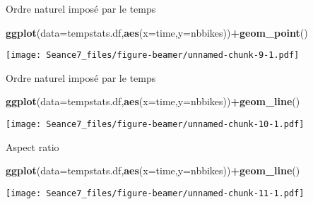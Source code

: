 \documentclass[ignorenonframetext,]{beamer}
\newenvironment{Shaded}{\begin{snugshade}}{\end{snugshade}}
\newcommand{\DataTypeTok}[1]{\textcolor[rgb]{0.13,0.29,0.53}{#1}}
\newcommand{\KeywordTok}[1]{\textcolor[rgb]{0.13,0.29,0.53}{\textbf{#1}}}
\newcommand{\NormalTok}[1]{#1}
\newcommand{\OperatorTok}[1]{\textcolor[rgb]{0.81,0.36,0.00}{\textbf{#1}}}
\begin{document}
\begin{frame}[fragile]{Ordre naturel imposé par le temps}
\protect\hypertarget{ordre-naturel-imposuxe9-par-le-temps}{}

\begin{Shaded}
\begin{Highlighting}[]
\KeywordTok{ggplot}\NormalTok{(}\DataTypeTok{data=}\NormalTok{tempstats.df,}\KeywordTok{aes}\NormalTok{(}\DataTypeTok{x=}\NormalTok{time,}\DataTypeTok{y=}\NormalTok{nbbikes))}\OperatorTok{+}\KeywordTok{geom_point}\NormalTok{()}
\end{Highlighting}
\end{Shaded}

\texttt{[image: Seance7\_files/figure-beamer/unnamed-chunk-9-1.pdf]}

\end{frame}

\begin{frame}[fragile]{Ordre naturel imposé par le temps}
\protect\hypertarget{ordre-naturel-imposuxe9-par-le-temps-1}{}

\begin{Shaded}
\begin{Highlighting}[]
\KeywordTok{ggplot}\NormalTok{(}\DataTypeTok{data=}\NormalTok{tempstats.df,}\KeywordTok{aes}\NormalTok{(}\DataTypeTok{x=}\NormalTok{time,}\DataTypeTok{y=}\NormalTok{nbbikes))}\OperatorTok{+}\KeywordTok{geom_line}\NormalTok{()}
\end{Highlighting}
\end{Shaded}

\texttt{[image: Seance7\_files/figure-beamer/unnamed-chunk-10-1.pdf]}

\end{frame}

\begin{frame}[fragile]{Aspect ratio}
\protect\hypertarget{aspect-ratio}{}

\begin{Shaded}
\begin{Highlighting}[]
\KeywordTok{ggplot}\NormalTok{(}\DataTypeTok{data=}\NormalTok{tempstats.df,}\KeywordTok{aes}\NormalTok{(}\DataTypeTok{x=}\NormalTok{time,}\DataTypeTok{y=}\NormalTok{nbbikes))}\OperatorTok{+}\KeywordTok{geom_line}\NormalTok{()}
\end{Highlighting}
\end{Shaded}

\texttt{[image: Seance7\_files/figure-beamer/unnamed-chunk-11-1.pdf]}

\end{frame}
\end{document}
